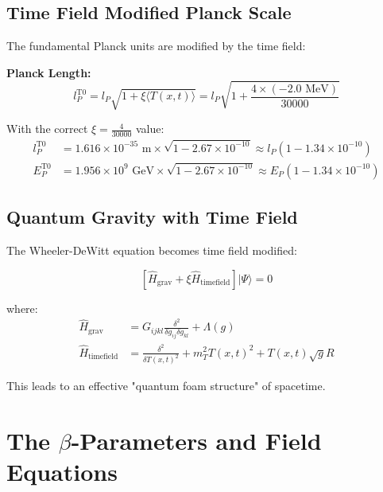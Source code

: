\documentclass[12pt,a4paper]{report}
\newcommand{\Tfield}{T(x,t)}  %
\newcommand{\xipar}{\xi}      %
\begin{document}
	\subsection{Time Field Modified Planck Scale}\label{subsec:timefield_planck_scale}
	
	The fundamental Planck units are modified by the time field:
	
	\textbf{Planck Length:}
	\begin{equation}\label{eq:planck_length_t0}
		l_P^{\text{T0}} = l_P \sqrt{1 + \xipar \langle \Tfield \rangle} = l_P \sqrt{1 + \frac{4 \times (-2.0 \text{ MeV})}{30000}}
	\end{equation}
	
	With the correct $\xipar = \frac{4}{30000}$ value:
	\begin{align}
		l_P^{\text{T0}} &= 1.616 \times 10^{-35} \text{ m} \times \sqrt{1 - 2.67 \times 10^{-10}} \approx l_P \left(1 - 1.34 \times 10^{-10}\right) \\
		E_P^{\text{T0}} &= 1.956 \times 10^9 \text{ GeV} \times \sqrt{1 - 2.67 \times 10^{-10}} \approx E_P \left(1 - 1.34 \times 10^{-10}\right)
	\end{align}
	
	\subsection{Quantum Gravity with Time Field}\label{subsec:quantum_gravity_timefield}
	
	The Wheeler-DeWitt equation becomes time field modified:
	
	\begin{equation}\label{eq:wheeler_dewitt_t0}
		\left[\hat{H}_{\text{grav}} + \xipar \hat{H}_{\text{timefield}}\right] |\Psi\rangle = 0
	\end{equation}
	
	where:
	\begin{align}
		\hat{H}_{\text{grav}} &= G_{ijkl} \frac{\delta^2}{\delta g_{ij} \delta g_{kl}} + \Lambda(g) \\
		\hat{H}_{\text{timefield}} &= \frac{\delta^2}{\delta \Tfield^2} + m_T^2 \Tfield^2 + \Tfield \sqrt{g} R
	\end{align}
	
	This leads to an effective "quantum foam structure" of spacetime.
	
	\section{The $\beta$-Parameters and Field Equations}\label{sec:beta_parameters_field_equations}
	
\end{document}
